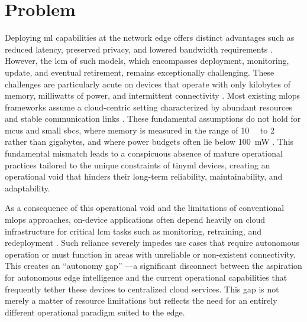 \section{Problem}
\label{sec:problem}

Deploying \gls{ml} capabilities at the network edge offers distinct advantages such as reduced latency, preserved privacy, and lowered bandwidth requirements \cite{capogrossoMachineLearningOrientedSurvey2024, tsoukasReviewEmergingTechnology2024}. However, the \gls{lcm} of such models, which encompasses deployment, monitoring, update, and eventual retirement, remains exceptionally challenging. These challenges are particularly acute on devices that operate with only kilobytes of memory, milliwatts of power, and intermittent connectivity \cite{szydloManagementTinyMLEnabled2024, disabatoTinyMachineLearning2024, antoniniTinyMLOpsFrameworkOrchestrating2022}. Most existing \gls{mlops} frameworks assume a cloud-centric setting characterized by abundant resources and stable communication links \cite{kreuzbergerMachineLearningOperations2023, johnMLOpsFrameworkMaturity2021, burgueno-romeroOpenSourceMLOps2025}. These fundamental assumptions do not hold for \glspl{mcu} and small \glspl{sbc}, where memory is measured in the range of \SI{10}{\kilo\byte} to \SI{2}{\mega\byte} rather than gigabytes, and where power budgets often lie below \SI{100}{\milli\watt} \cite{banburyBenchmarkingTinyMLSystems2021, linMCUNetTinyDeep2020a, zaidiUnlockingEdgeIntelligence2022}. This fundamental mismatch leads to a conspicuous absence of mature operational practices tailored to the unique constraints of \gls{tinyml} devices, creating an operational void that hinders their long-term reliability, maintainability, and adaptability.

As a consequence of this operational void and the limitations of conventional \gls{mlops} approaches, on-device applications often depend heavily on cloud infrastructure for critical \gls{lcm} tasks such as monitoring, retraining, and redeployment \cite{kreuzbergerMachineLearningOperations2023}. Such reliance severely impedes use cases that require autonomous operation or must function in areas with unreliable or non-existent connectivity. This creates an ``autonomy gap'' —a significant disconnect between the aspiration for autonomous edge intelligence and the current operational capabilities that frequently tether these devices to centralized cloud services. This gap is not merely a matter of resource limitations but reflects the need for an entirely different operational paradigm suited to the edge.

